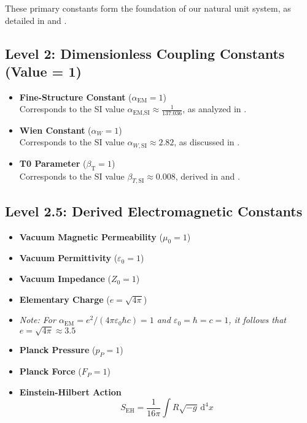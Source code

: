\documentclass[12pt,a4paper]{article}
\newcommand{\alphaEM}{\alpha_{\text{EM}}}
\newcommand{\betaT}{\beta_{\text{T}}}
\newcommand{\alphaEMSI}{\alpha_{\text{EM,SI}}}
\begin{document}
	These primary constants form the foundation of our natural unit system, as detailed in \cite{pascher_planck_2025} and \cite{pascher_alphabeta_2025}.
	
	\subsection*{Level 2: Dimensionless Coupling Constants (Value = 1)}
	\begin{itemize}[itemsep=0.5em]
		\item \textbf{Fine-Structure Constant} (\(\alphaEM = 1\)) \\
		Corresponds to the SI value \(\alphaEMSI \approx \frac{1}{137.036}\), as analyzed in \cite{pascher_alpha_2025}.
		\item \textbf{Wien Constant} (\(\alpha_W = 1\)) \\
		Corresponds to the SI value \(\alpha_{W,\mathrm{SI}} \approx 2.82\), as discussed in \cite{pascher_temp_2025}.
		\item \textbf{T0 Parameter} (\(\betaT = 1\)) \\
		Corresponds to the SI value \(\beta_{T,\mathrm{SI}} \approx 0.008\), derived in \cite{pascher_params_2025} and \cite{pascher_alphabeta_2025}.
	\end{itemize}
	
	\subsection*{Level 2.5: Derived Electromagnetic Constants}
	\begin{itemize}[itemsep=0.5em]
		\item \textbf{Vacuum Magnetic Permeability} (\(\mu_0 = 1\))
		\item \textbf{Vacuum Permittivity} (\(\varepsilon_0 = 1\))
		\item \textbf{Vacuum Impedance} (\(Z_0 = 1\))
		\item \textbf{Elementary Charge} (\(e = \sqrt{4\pi}\))
		\item[] \textit{Note: For $\alphaEM = e^2/(4\pi\varepsilon_0\hbar c) = 1$ and $\varepsilon_0 = \hbar = c = 1$, it follows that $e = \sqrt{4\pi} \approx 3.5$}
		\item \textbf{Planck Pressure} (\(p_P = 1\))
		\item \textbf{Planck Force} (\(F_P = 1\))
		\item \textbf{Einstein-Hilbert Action}
		\[
		S_{\mathrm{EH}} = \frac{1}{16\pi} \int R \sqrt{-g} \, \mathrm{d}^4x
		\]
	\end{itemize}
	
\end{document}
